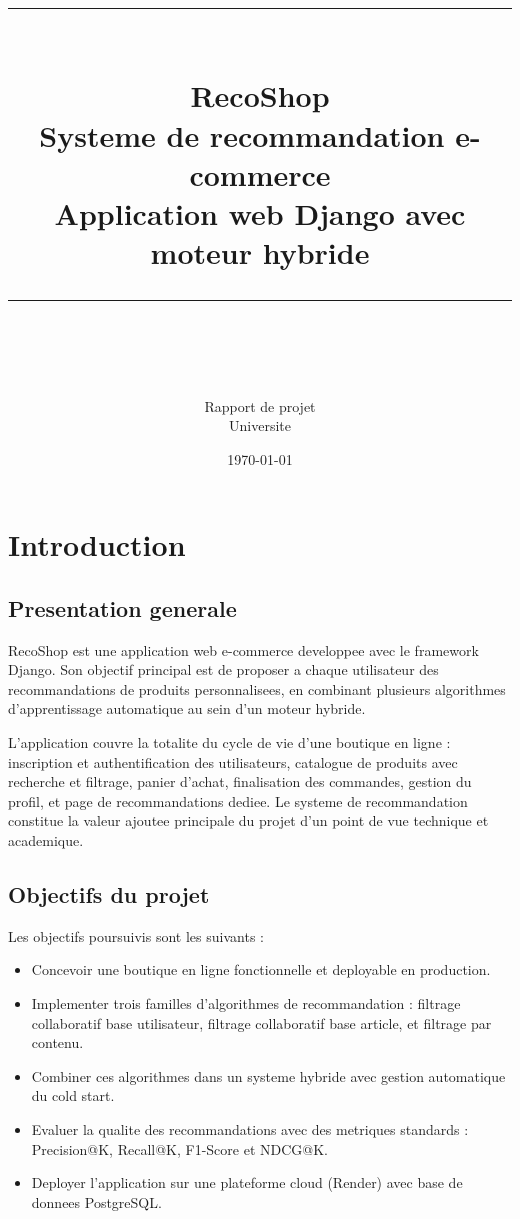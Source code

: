 \documentclass[12pt,a4paper]{report}
\title{
  \vspace{2cm}
  {\color{gold}\rule{\linewidth}{1.5pt}}\\[0.4cm]
  {\Huge\bfseries RecoShop}\\[0.3cm]
  {\large Systeme de recommandation e-commerce}\\[0.2cm]
  {\large Application web Django avec moteur hybride}\\[0.4cm]
  {\color{gold}\rule{\linewidth}{1.5pt}}\\[2cm]
}
\author{
  Rapport de projet\\[0.5cm]
  \large Universite\\[0.2cm]
}
\date{\today}
\begin{document}

\maketitle
\thispagestyle{empty}

\newpage
\tableofcontents
\newpage

\chapter{Introduction}

\section{Presentation generale}

RecoShop est une application web e-commerce developpee avec le framework Django.
Son objectif principal est de proposer a chaque utilisateur des recommandations
de produits personnalisees, en combinant plusieurs algorithmes d'apprentissage
automatique au sein d'un moteur hybride.

L'application couvre la totalite du cycle de vie d'une boutique en ligne : 
inscription et authentification des utilisateurs, catalogue de produits avec 
recherche et filtrage, panier d'achat, finalisation des commandes, gestion du 
profil, et page de recommandations dediee. Le systeme de recommandation 
constitue la valeur ajoutee principale du projet d'un point de vue technique 
et academique.

\section{Objectifs du projet}

Les objectifs poursuivis sont les suivants :

\begin{itemize}
  \item Concevoir une boutique en ligne fonctionnelle et deployable en production.
  \item Implementer trois familles d'algorithmes de recommandation : filtrage 
        collaboratif base utilisateur, filtrage collaboratif base article, et 
        filtrage par contenu.
  \item Combiner ces algorithmes dans un systeme hybride avec gestion automatique 
        du cold start.
  \item Evaluer la qualite des recommandations avec des metriques standards : 
        Precision@K, Recall@K, F1-Score et NDCG@K.
  \item Deployer l'application sur une plateforme cloud (Render) avec base de 
        donnees PostgreSQL.
\end{itemize}
\end{document}
